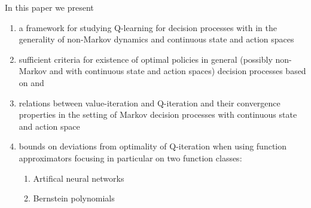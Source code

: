 
In this paper we present
\begin{enumerate}
  \item a framework for studying Q-learning for decision processes with
    in the generality of non-Markov dynamics and
    continuous state and action spaces
  \item sufficient criteria for existence of optimal policies in general
    (possibly non-Markov and with continuous state and action spaces)
    decision processes based on  and 
  \item relations between value-iteration and Q-iteration and their convergence
    properties in the setting of Markov decision processes with
    continuous state and action space
  \item bounds on deviations from optimality of Q-iteration when using function
    approximators focusing in particular on two function classes:
    \begin{enumerate}
      \item Artifical neural networks
      \item Bernstein polynomials
    \end{enumerate}
\end{enumerate}
